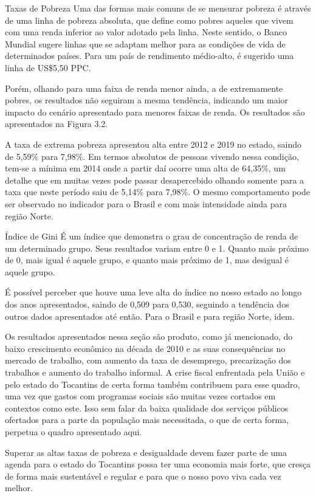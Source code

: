 \begin{smbox}[label={labelbox},nameref={Taxas de Pobreza}]{Taxas de Pobreza}
	Uma das formas mais comuns de se mensurar pobreza é através de uma linha de pobreza absoluta, que define como pobres aqueles que vivem com uma renda inferior ao valor adotado pela linha. Neste sentido, o Banco Mundial sugere linhas que se adaptam melhor para as condições de vida de determinados países. Para um país de rendimento médio-alto, é sugerido uma linha de US\$5,50 PPC.  
\end{smbox}
\par Porém, olhando para uma faixa de renda menor ainda, a de extremamente pobres, os resultados não seguiram a mesma tendência, indicando um maior impacto do cenário apresentado para menores faixas de renda. Os resultados são apresentados na Figura 3.2.
\par A taxa de extrema pobreza apresentou alta entre 2012 e 2019 no estado, saindo de 5,59\% para 7,98\%. Em termos absolutos de pessoas vivendo nessa condição, tem-se a mínima em 2014 onde a partir daí ocorre uma alta de 64,35\%, um detalhe que em muitas vezes pode passar desapercebido olhando somente para a taxa que neste período saiu de 5,14\% para 7,98\%. O mesmo comportamento pode ser observado no indicador para o Brasil e  com mais intensidade ainda para região Norte.
\begin{smbox}[label={labelbox},nameref={Índice de Gini}]{Índice de Gini}
	É um índice que demonstra o grau de concentração de renda de um determinado grupo. Seus resultados variam entre 0 e 1. Quanto mais próximo de 0, mais igual é aquele grupo, e quanto mais próximo de 1, mas desigual é aquele grupo.
\end{smbox}
\par É possível perceber que houve uma leve alta do índice no nosso estado ao longo dos anos apresentados, saindo de 0,509 para 0,530, seguindo a tendência dos outros dados apresentados até então. Para o Brasil e para região Norte, idem. 
\par Os resultados apresentados nessa seção são produto, como já mencionado, do baixo crescimento econômico na década de 2010 e as suas consequências no mercado de trabalho, com aumento da taxa de desemprego, precarização dos trabalhos e aumento do trabalho informal. A crise fiscal enfrentada pela União e pelo estado do Tocantins de certa forma também contribuem para esse quadro, uma vez que gastos com programas sociais são muitas vezes cortados em contextos como este. Isso sem falar da baixa qualidade dos serviços públicos ofertados para a parte da população mais necessitada, o que de certa forma, perpetua o quadro apresentado aqui.
\par Superar as altas taxas de pobreza e desigualdade devem fazer parte de uma agenda para o estado do Tocantins possa ter uma economia mais forte, que cresça de forma mais sustentável e regular e para que o nosso povo viva cada vez melhor.  
